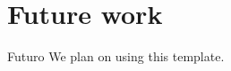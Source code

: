 \documentclass[slidestop,c]{beamer}
\begin{document}
\section{Future work}
\begin{frame}[c]{Futuro}
    \justifying
    We plan on using this template.
\end{frame}

\begin{frame}[plain]
\begin{center}
\structure{\Huge \textcolor{azul2}{The end. \\ Questions?}}
\end{center}
\end{frame}
\end{document}
